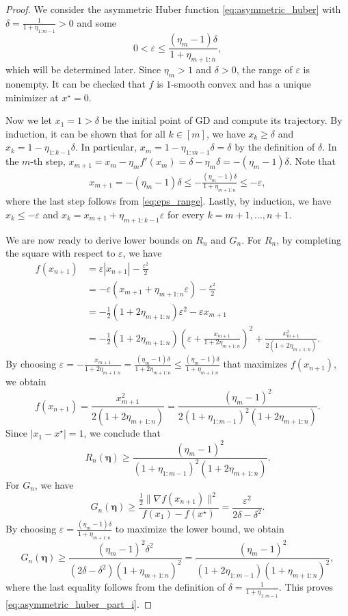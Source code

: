 \documentclass[10pt,a4paper]{amsart}
\newcommand{\abs}[1]{\left\lvert#1\right\rvert}
\newcommand{\norm}[1]{\lVert#1\rVert}
\newcommand{\schedule}{\bm{\eta}}
\begin{document}
\begin{proof}
We consider the asymmetric Huber function \eqref{eq:asymmetric_huber} with $\delta= \frac{ 1 }{ 1+\eta_{1:m-1} } > 0$ and some
\begin{equation}\label{eq:eps_range}
	0< \varepsilon \leq \frac{  (\eta_m-1)\delta }{ 1 + \eta_{m+1:n} },
\end{equation}
which will be determined later.
Since $\eta_m>1$ and $\delta>0$, the range of $\varepsilon$ is nonempty.
It can be checked that $f$ is $1$-smooth convex and has a unique minimizer at $x^\star=0$.

Now we let $x_1 = 1 > \delta$ be the initial point of GD and compute its trajectory.
By induction, it can be shown that for all $k\in[m]$, we have $x_k\geq\delta$ and $x_k = 1 - \eta_{1:k-1}\delta$.
In particular, $x_m = 1 - \eta_{1:m-1}\delta = \delta$ by the definition of $\delta$.
In the $m$-th step, $x_{m+1} = x_m - \eta_m f'(x_m) = \delta - \eta_m\delta = -(\eta_m-1)\delta$.
Note that
\begin{align*}
	x_{m+1} = -(\eta_m-1)\delta \leq -\frac{  (\eta_m-1)\delta }{ 1 + \eta_{m+1:n} } \leq -\varepsilon,
\end{align*}
where the last step follows from \eqref{eq:eps_range}.
Lastly, by induction, we have $x_k\leq-\varepsilon$ and $x_{k} = x_{m+1} + \eta_{m+1:k-1}\varepsilon$ for every $k=m+1,\ldots,n+1$.


We are now ready to derive lower bounds on $R_n$ and $G_n$.
For $R_n$, by completing the square with respect to $\varepsilon$, we have
\begin{align*}
	f(x_{n+1})
	&= \varepsilon\abs{ x_{n+1} } - \frac{ \varepsilon^2 }{2}  \\
	&= -\varepsilon( x_{m+1} + \eta_{m+1:n}\varepsilon ) - \frac{ \varepsilon^2 }{2} \\
	&= - \frac{1}{2} \left( 1 + 2\eta_{m+1:n} \right) \varepsilon^2 - \varepsilon x_{m+1} \\
	&= - \frac{1}{2} \left( 1 + 2\eta_{m+1:n} \right) \left( \varepsilon + \frac{x_{m+1}}{1+2\eta_{m+1:n}} \right)^2 + \frac{ x_{m+1}^2 }{ 2 ( 1+2\eta_{m+1:n} ) }.
\end{align*}
By choosing $\varepsilon = -\frac{ x_{m+1} }{ 1 + 2\eta_{m+1:n} } = \frac{  (\eta_m-1)\delta }{ 1 + 2\eta_{m+1:n} } \leq \frac{  (\eta_m-1)\delta }{ 1 + \eta_{m+1:n} }$ that maximizes $f(x_{n+1})$, we obtain
\[
	f(x_{n+1}) = \frac{ x_{m+1}^2 }{ 2 ( 1+2\eta_{m+1:n} ) }
	= \frac{ (\eta_m-1)^2 }{ 2 (1 + \eta_{1:m-1})^2( 1+2\eta_{m+1:n} ) }.
\]
Since $\abs{x_1-x^\star}=1$, we conclude that
\[
	R_n(\schedule) \geq \frac{ (\eta_m-1)^2 }{ (1 + \eta_{1:m-1})^2( 1+2\eta_{m+1:n} ) }.
\]
For $G_n$, we have
\[
	G_n(\schedule)
	\geq \frac{ \frac{1}{2}\norm{ \nabla f(x_{n+1}) }^2 }{ f(x_1) - f(x^\star) }
	= \frac{ \varepsilon^2 }{ 2\delta - \delta^2 }.
\]
By choosing $\varepsilon = \frac{  (\eta_m-1)\delta }{ 1 + \eta_{m+1:n} }$ to maximize the lower bound, we obtain
\[
	G_n(\schedule)
	\geq \frac{ (\eta_m-1)^2\delta^2 }{ (2\delta-\delta^2)(1+\eta_{m+1:n})^2 }
	= \frac{ (\eta_m-1)^2 }{ (1 + 2\eta_{1:m-1})(1+\eta_{m+1:n})^2 },
\]
where the last equality follows from the definition of $\delta=\frac{1}{1+\eta_{1:m-1}}$.
This proves \eqref{eq:asymmetric_huber_part_i}.


\end{proof}
\end{document}
